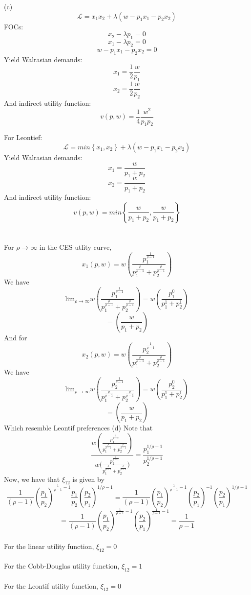\documentclass[letterpaper,12pt]{article}
\theoremstyle{definition}
\begin{document}
(c) \[\mathscr{L} = x_1x_2 + \lambda (w - p_1x_1 -p_2x_2) \]
FOCs:
\[ x_2 - \lambda p_1  = 0 \]
\[ x_1 - \lambda p_2  = 0 \]
\[w - p_1x_1 - p_2x_2 = 0 \]
Yield Walrasian demands:
\[x_1 = \frac{1}{2}\frac{w}{p_1} \]
\[x_2 = \frac{1}{2}\frac{w}{p_2} \]
And indirect utility function:
\[v(p,w) = \frac{1}{4}\frac{w^2}{p_1p_2}\]

For Leontief:
\[ \mathscr{L} = min\left\{ x_1, x_2 \right\} + \lambda(w- p_1x_1 - p_2x_2)\]
Yield Walrasian demands:
\[x_1 = \frac{w}{p_1 + p_2}\]
\[x_2 = \frac{w}{p_1 + p_2}\]
And indirect utility function:
\[v(p,w) = min \left\{ \frac{w}{p_1 + p_2},\frac{w}{p_1 + p_2} \right\}\]
\\\\
For $\rho \to \infty$ in the CES utlity curve,
\[x_1(p,w) = w \left( \frac{p_1^{\frac{1}{\rho-1}}}{p_1^{\frac{\rho}{\rho-1}} + p_2^{\frac{\rho}{\rho-1}}} \right)\]
We have
\[\text{lim}_{\rho \to \infty} w \left( \frac{p_1^{\frac{1}{\rho-1}}}{p_1^{\frac{\rho}{\rho-1}} + p_2^{\frac{\rho}{\rho-1}}} \right) = w \left( \frac{p_1^0}{p_1^1 + p_2^1} \right)\]
\[=  \left( \frac{w}{p_1 + p_2} \right)\]
And for 
\[x_2(p,w) = w \left( \frac{p_2^{\frac{1}{\rho-1}}}{p_1^{\frac{\rho}{\rho-1}} + p_2^{\frac{\rho}{\rho-1}}} \right)\]
We have
\[\text{lim}_{\rho \to \infty} w \left( \frac{p_2^{\frac{1}{\rho-1}}}{p_1^{\frac{\rho}{\rho-1}} + p_2^{\frac{\rho}{\rho-1}}} \right) = w \left( \frac{p_2^0}{p_1^1 + p_2^1} \right)\]
\[=  \left( \frac{w}{p_1 + p_2} \right)\]
Which resemble Leontif preferences
(d)
Note that
\[ \frac{w \left( \frac{p_1^{\frac{1}{\rho-1}}}{p_1^{\frac{\rho}{\rho-1}} + p_2^{\frac{\rho}{\rho-1}}} \right)}
{w \Big( \frac{p_2^{\frac{1}{\rho-1}}}{p_1^{\frac{\rho}{\rho-1}} + p_2^{\frac{\rho}{\rho-1}}} \Big)}
=
\frac{p_1^{1/\rho-1}}{p_2^{1/\rho-1}}
\] 
Now, we have that $\xi_{12}$ is given by
\[\frac{1}{(\rho-1)} \left( \frac{p_1}{p_2} \right)^{\frac{1}{\rho-1}-1}\frac{p_1}{p_2}\left(\frac{p_2}{p_1}  \right)^{1/\rho-1} =\frac{1}{(\rho-1)} \left( \frac{p_1}{p_2} \right)^{\frac{1}{\rho-1}-1}\left( \frac{p_2}{p_1} \right)^{-1}\left(\frac{p_2}{p_1}  \right)^{1/\rho-1} \]
\[= \frac{1}{(\rho-1)} \left( \frac{p_1}{p_2} \right)^{\frac{1}{\rho-1}-1}\left(\frac{p_2}{p_1}  \right)^{\frac{1}{\rho-1}-1} = \frac{1}{\rho-1}\]
\\
For the linear utility function, $\xi_{12} = 0$\\\\
For the Cobb-Douglas utility function, $\xi_{12} = 1$\\\\
For the Leontif utility function, $\xi_{12} = 0$\\\\
\end{document}
